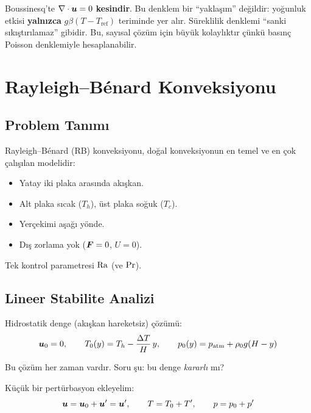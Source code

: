 \begin{remark}
Boussinesq'te $\nabla \cdot\bm{u} = 0$ \textbf{kesindir}. Bu denklem bir ``yaklaşım'' değildir: yoğunluk etkisi \textbf{yalnızca} $g\beta(T-T_{\text{ref}})$ teriminde yer alır. Süreklilik denklemi ``sanki sıkıştırılamaz'' gibidir. Bu, sayısal çözüm için büyük kolaylıktır çünkü basınç Poisson denklemiyle hesaplanabilir.
\end{remark}


\section{Rayleigh--B\'{e}nard Konveksiyonu}
\label{sec:rayleigh_benard}

\subsection{Problem Tanımı}

Rayleigh--Bénard (RB) konveksiyonu, doğal konveksiyonun en temel ve en çok çalışılan modelidir:

\begin{itemize}
    \item Yatay iki plaka arasında akışkan.
    \item Alt plaka sıcak ($T_h$), üst plaka soğuk ($T_c$).
    \item Yerçekimi aşağı yönde.
    \item Dış zorlama yok ($\bm{F} = 0$, $U = 0$).
\end{itemize}

Tek kontrol parametresi $\mathrm{Ra}$ (ve $\mathrm{Pr}$).

\subsection{Lineer Stabilite Analizi}

Hidrostatik denge (akışkan hareketsiz) çözümü:
\begin{equation}
    \bm{u}_0 = 0, \qquad T_0(y) = T_h - \frac{\Delta T}{H}\,y, \qquad p_0(y) = p_{\text{atm}} + \rho_0 g (H-y)
    \label{eq:hydrostatic}
\end{equation}

Bu çözüm her zaman vardır. Soru şu: bu denge \textit{kararlı} mı?

Küçük bir pertürbasyon ekleyelim:
\begin{equation}
    \bm{u} = \bm{u}_0 + \bm{u}' = \bm{u}', \qquad T = T_0 + T', \qquad p = p_0 + p'
\end{equation}

